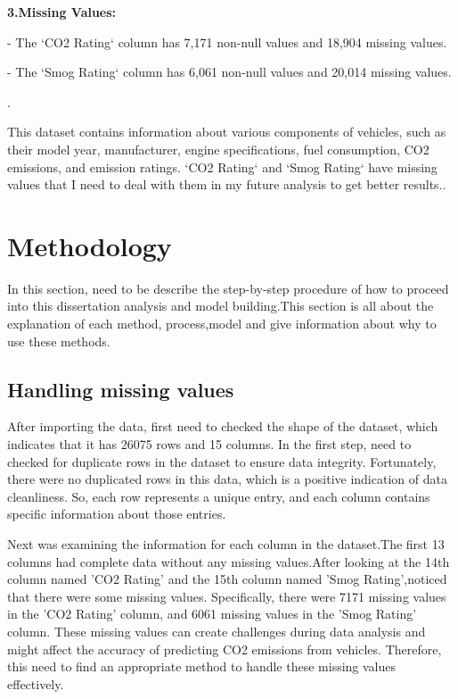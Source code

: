 \documentclass[12pt, a4paper,oneside]{book}
\numberwithin{equation}{section}
\begin{document}
    

\textbf{3.Missing Values:}

   - The `CO2 Rating` column has 7,171 non-null values and 18,904 missing values.
   
   - The `Smog Rating` column has 6,061 non-null values and 20,014 missing values.
   
\hfill \break.

This dataset contains information about various components of vehicles, such as their model year, manufacturer, engine specifications, fuel consumption, CO2 emissions, and emission ratings. `CO2 Rating` and `Smog Rating` have missing values that I need to deal with them in my future analysis to get better results..~\cite{ref1}





\chapter{Methodology}\label{ch:4}

In this section, need to be describe the step-by-step procedure of how to proceed into this dissertation analysis and model building.This section is all about the explanation of each method, process,model and give information about why to use these methods.

\section{Handling missing values}

After importing the data, first need to checked the shape of the dataset, which indicates that it has 26075 rows and 15 columns. In the first step, need to checked for duplicate rows in the dataset to ensure data integrity. Fortunately, there were no duplicated rows in this data, which is a positive indication of data cleanliness. So, each row represents a unique entry, and each column contains specific information about those entries.

Next was examining the information for each column in the dataset.The first 13 columns had complete data without any missing values.After looking at the 14th column named 'CO2 Rating' and the 15th column named 'Smog Rating',noticed that there were some missing values. Specifically, there were 7171 missing values in the 'CO2 Rating' column, and 6061 missing values in the 'Smog Rating' column. These missing values can create challenges during data analysis and might affect the accuracy of predicting CO2 emissions from vehicles. Therefore, this need to find an appropriate method to handle these missing values effectively.
\end{document}
